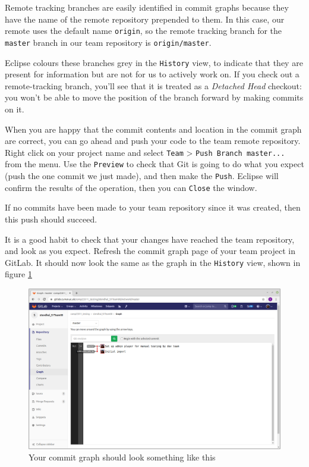 \documentclass[
]{book}
\begin{document}
Remote tracking branches are easily identified in commit graphs because they have the name of the remote repository prepended to them. In this case, our remote uses the default name \texttt{origin}, so the remote tracking branch for the \texttt{master} branch in our team repository is \texttt{origin/master}.

Eclipse colours these branches grey in the \texttt{History} view, to indicate that they are present for information but are not for us to actively work on. If you check out a remote-tracking branch, you'll see that it is treated as a \emph{Detached Head} checkout: you won't be able to move the position of the branch forward by making commits on it.

When you are happy that the commit contents and location in the commit graph are correct, you can go ahead and push your code to the team remote repository. Right click on your project name and select \texttt{Team} \textgreater{} \texttt{Push\ Branch\ \textquotesingle{}master\textquotesingle{}...} from the menu. Use the \texttt{Preview} to check that Git is going to do what you expect (push the one commit we just made), and then make the \texttt{Push}. Eclipse will confirm the results of the operation, then you can \texttt{Close} the window.

If no commits have been made to your team repository since it was created, then this push should succeed.

It is a good habit to check that your changes have reached the team repository, and look as you expect. Refresh the commit graph page of your team project in GitLab. It should now look the same as the graph in the \texttt{History} view, shown in figure \ref{fig:commitGraphInGitLabAfterPushNoHistory-fig}

\begin{figure}

{\centering \includegraphics[width=1\linewidth]{images/commitGraphInGitLabAfterPushNoHistory} 

}

\caption{Your commit graph should look something like this}\label{fig:commitGraphInGitLabAfterPushNoHistory-fig}
\end{figure}
\end{document}
